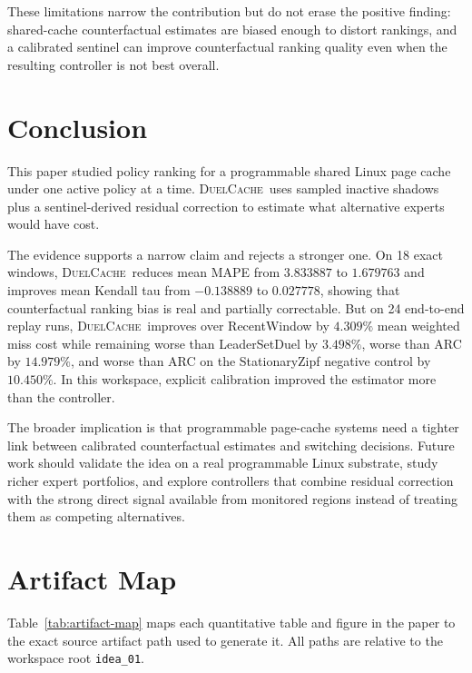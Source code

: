 \documentclass{article}
\newcommand{\duel}{\textsc{DuelCache}}
\begin{document}
These limitations narrow the contribution but do not erase the positive finding: shared-cache counterfactual estimates are biased enough to distort rankings, and a calibrated sentinel can improve counterfactual ranking quality even when the resulting controller is not best overall.

\section{Conclusion}
\label{sec:conclusion}

This paper studied policy ranking for a programmable shared Linux page cache under one active policy at a time. \duel\ uses sampled inactive shadows plus a sentinel-derived residual correction to estimate what alternative experts would have cost.

The evidence supports a narrow claim and rejects a stronger one. On 18 exact windows, \duel\ reduces mean MAPE from $3.833887$ to $1.679763$ and improves mean Kendall tau from $-0.138889$ to $0.027778$, showing that counterfactual ranking bias is real and partially correctable. But on 24 end-to-end replay runs, \duel\ improves over RecentWindow by $4.309\%$ mean weighted miss cost while remaining worse than LeaderSetDuel by $3.498\%$, worse than ARC by $14.979\%$, and worse than ARC on the StationaryZipf negative control by $10.450\%$. In this workspace, explicit calibration improved the estimator more than the controller.

The broader implication is that programmable page-cache systems need a tighter link between calibrated counterfactual estimates and switching decisions. Future work should validate the idea on a real programmable Linux substrate, study richer expert portfolios, and explore controllers that combine residual correction with the strong direct signal available from monitored regions instead of treating them as competing alternatives.

\appendix

\section{Artifact Map}
\label{sec:appendix-artifacts}

Table~\ref{tab:artifact-map} maps each quantitative table and figure in the paper to the exact source artifact path used to generate it. All paths are relative to the workspace root \texttt{idea\_01}.
\end{document}
